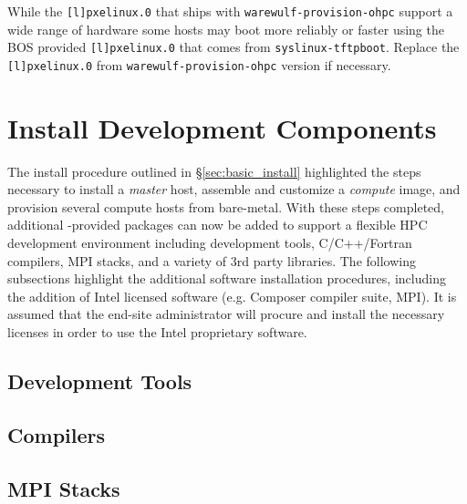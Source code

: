\documentclass[letterpaper]{article}
\begin{document}
\begin{center}
\begin{tcolorbox}[]
\small
While the \texttt{[l]pxelinux.0} that ships with \texttt{warewulf-provision-ohpc}
support a wide range of hardware some hosts may boot more reliably or faster
using the BOS provided \texttt{[l]pxelinux.0} that comes from
\texttt{syslinux-tftpboot}. Replace the \texttt{[l]pxelinux.0} from 
\texttt{warewulf-provision-ohpc} version if necessary.
\end{tcolorbox}
\end{center}

\section{Install \OHPC{} Development Components}

The install procedure outlined in \S\ref{sec:basic_install}
highlighted the steps necessary to install a {\em master} host,
assemble and customize a {\em compute} image, and provision several
compute hosts from bare-metal. With these steps completed, 
additional \OHPC{}-provided packages can now be added to support a flexible HPC
development environment including development tools, C/C++/Fortran compilers,
MPI stacks, and a variety of 3rd party libraries. The following subsections
highlight the additional software installation procedures, including the
addition of Intel licensed software (e.g. Composer compiler suite, \Intel{}
MPI). It is assumed that the end-site administrator will procure and install
the necessary licenses in order to use the Intel proprietary software.

\subsection{Development Tools} \label{sec:install_dev_tools}


\subsection{Compilers} \label{sec:install_compilers}


\subsection{MPI Stacks} \label{sec:mpi}

\end{document}
